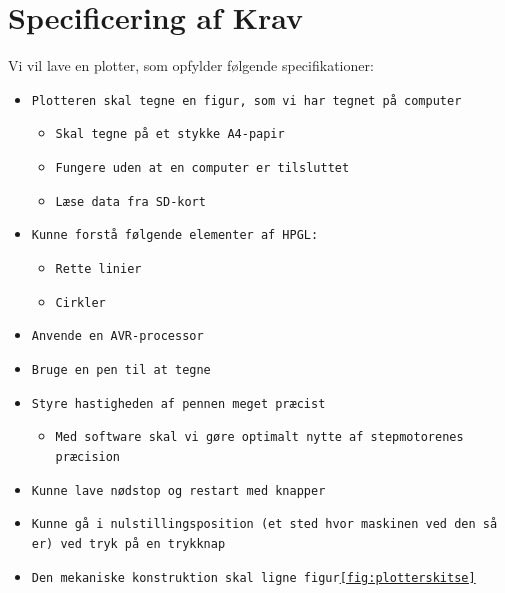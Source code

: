 \section{Specificering af Krav}

Vi vil lave en plotter, som opfylder følgende specifikationer:

\begin{itemize}
\item \texttt{Plotteren skal tegne en figur, som vi har tegnet på computer}
  \begin{itemize}
  \item \texttt{Skal tegne på et stykke A4-papir}
  \item \texttt{Fungere uden at en computer er tilsluttet}
  \item \texttt{Læse data fra SD-kort}
  \end{itemize}
\item \texttt{Kunne forstå følgende elementer af HPGL:}
  \begin{itemize}
  \item \texttt{Rette linier}
  \item \texttt{Cirkler}
  \end{itemize}
\item \texttt{Anvende en AVR-processor}
\item \texttt{Bruge en pen til at tegne}
\item \texttt{Styre hastigheden af pennen meget præcist}
  \begin{itemize}
  \item \texttt{Med software skal vi gøre optimalt nytte af stepmotorenes præcision}
  \end{itemize}
\item \texttt{Kunne lave nødstop og restart med knapper}
\item \texttt{Kunne gå i nulstillingsposition (et sted hvor maskinen ved den
  så er) ved tryk på en trykknap}
\item \texttt{Den mekaniske konstruktion skal ligne figur\vref{fig:plotterskitse}}
\end{itemize}
